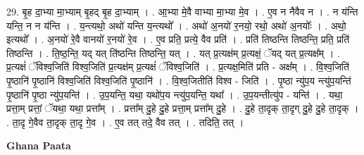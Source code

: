 \documentclass[17pt]{extarticle}
\begin{document}
29. बृ॒ह दा॒भ्या मा॒भ्याम् बृ॒हद् बृ॒ह दा॒भ्याम् । . आ॒भ्या मे॒वै वाभ्या मा॒भ्या मे॒व । . ए॒व न नैवैव न । . न य॑न्ति यन्ति॒ न न य॑न्ति । . य॒न्त्यथो॒ अथो॑ यन्ति य॒न्त्यथो᳚ । . अथो॑ अ॒नयो॑ र॒नयो॒ रथो॒ अथो॑ अ॒नयोः᳚ । . अथो॒ इत्यथो᳚ । . अ॒नयो॑ रे॒वै वानयो॑ र॒नयो॑ रे॒व । . ए॒व प्रति॒ प्रत्ये॒ वैव प्रति॑ । . प्रति॑ तिष्ठन्ति तिष्ठन्ति॒ प्रति॒ प्रति॑ तिष्ठन्ति । . ति॒ष्ठ॒न्ति॒ यद् यत् ति॑ष्ठन्ति तिष्ठन्ति॒ यत् । . यत् प्र॒त्यक्ष॑म् प्र॒त्यक्षं॒ ॅयद् यत् प्र॒त्यक्ष᳚म् । . प्र॒त्यक्षं॑ ॅविश्व॒जिति॑ विश्व॒जिति॑ प्र॒त्यक्ष॑म् प्र॒त्यक्षं॑ ॅविश्व॒जिति॑ । . प्र॒त्यक्ष॒मिति॑ प्रति - अक्ष᳚म् । . वि॒श्व॒जिति॑ पृ॒ष्ठानि॑ पृ॒ष्ठानि॑ विश्व॒जिति॑ विश्व॒जिति॑ पृ॒ष्ठानि॑ । . वि॒श्व॒जितीति॑ विश्व - जिति॑ । . पृ॒ष्ठा न्यु॑प॒य न्त्यु॑प॒यन्ति॑ पृ॒ष्ठानि॑ पृ॒ष्ठा न्यु॑प॒यन्ति॑ । . उ॒प॒यन्ति॒ यथा॒ यथो॑प॒य न्त्यु॑प॒यन्ति॒ यथा᳚ । . उ॒प॒यन्तीत्यु॑प - यन्ति॑ । . यथा॒ प्रत्ता॒म् प्रत्तां॒ ॅयथा॒ यथा॒ प्रत्ता᳚म् । . प्रत्ता᳚म् दु॒हे दु॒हे प्रत्ता॒म् प्रत्ता᳚म् दु॒हे । . दु॒हे ता॒दृक् ता॒दृग् दु॒हे दु॒हे ता॒दृक् । . ता॒दृ गे॒वैव ता॒दृक् ता॒दृ गे॒व । . ए॒व तत् तदे॒ वैव तत् । . तदिति॒ तत् । \newline

\textbf{Ghana Paata } \newline
\end{document}
